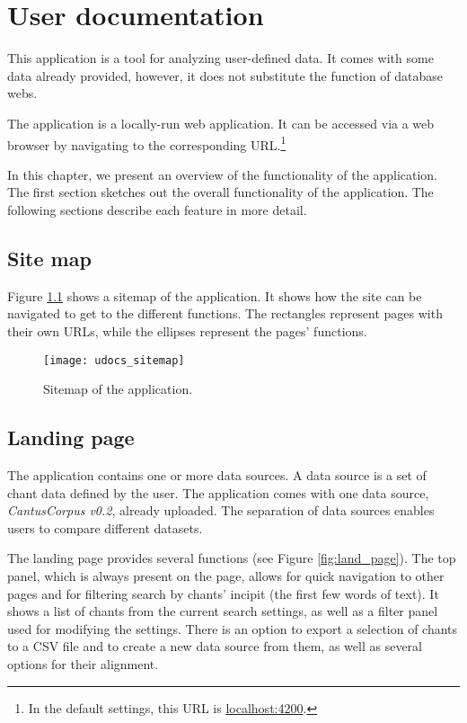 \chapter{User documentation}

This application is a tool for analyzing user-defined data. It comes with some data already provided, however, it does not substitute the
function of database webs.

The application is a locally-run web application. It can be accessed via a web browser by navigating to the corresponding URL.\footnote{
In the default settings, this URL is \url{localhost:4200}.}

In this chapter, we present an overview of the functionality of the application. The first section sketches out the overall
functionality of the application. The following sections describe each feature in more detail.


\section{Site map}

Figure \ref{fig:sitemap} shows a sitemap of the application. It shows how the site can be navigated to get to the different functions.
The rectangles represent pages with their own URLs, while the ellipses represent the pages' functions.

\begin{figure}[!h]
\centering
\texttt{[image: udocs\_sitemap]}
\caption{Sitemap of the application.}
\label{fig:sitemap}
\end{figure}

\section{Landing page}

The application contains one or more data sources. A data source is a set of chant data defined by the user. The application comes with one data
source, \emph{CantusCorpus v0.2}, already uploaded. The separation of data sources enables users to compare different datasets.

The landing page provides several functions (see Figure \ref{fig:land_page}). The top panel, which is always present on the page, allows for quick
navigation to other pages and for filtering search by chants' incipit (the first few words of text). It shows a list of chants from the current search
settings, as well as a filter panel used for modifying the settings. There is an option to export a selection of chants to a CSV file and to create a new
data source from them, as well as several options for their alignment.

